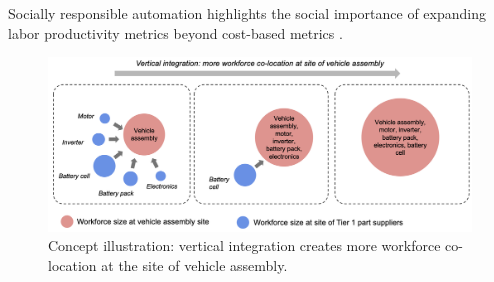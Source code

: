 \documentclass[sn-mathphys,Numbered]{sn-jnl}%
\begin{document}




Socially responsible automation highlights the social importance of expanding labor productivity metrics beyond cost-based metrics \cite{Sampath2018-bo}.

\begin{figure}[ht]
\centering
\includegraphics[width=1\linewidth]{figures/fig_vertical_integration.png}
\caption{Concept illustration: vertical integration creates more workforce co-location at the site of vehicle assembly.}
\label{fig:vertical-integration}
\end{figure}
\end{document}
